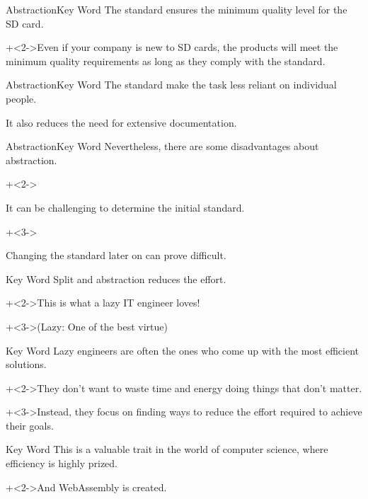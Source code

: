 \begin{frame}{Abstraction}{Key Word}
    The standard ensures the minimum quality level for the SD card.
    \vspace{4ex}

    \onslide+<2->{Even if your company is new to SD cards, the products will meet the minimum quality requirements as long as they comply with the standard.}
\end{frame}


\begin{frame}{Abstraction}{Key Word}
    The standard make the task less reliant on individual people.
    \vspce{4ex}

    It also reduces the need for extensive documentation.
\end{frame}


\begin{frame}{Abstraction}{Key Word}
    Nevertheless, there are some disadvantages about abstraction.
    \vspace{4ex}

    \begin{itemize}
        \onslide+<2->{\item It can be challenging to determine the initial standard.}
        \onslide+<3->{\item Changing the standard later on can prove difficult.}
    \end{itemize}
\end{frame}


\begin{frame}{Key Word}
    Split and abstraction reduces the effort.
    \vspace{4ex}

    \onslide+<2->{This is what a lazy IT engineer loves!}
    \vspace{2ex}

    \onslide+<3->{{\Large (Lazy: One of the best virtue)}}
\end{frame}


\begin{frame}{Key Word}{}
    Lazy engineers are often the ones who come up with the most efficient solutions.
    \vspace{4ex}

    \onslide+<2->{They don't want to waste time and energy doing things that don't matter.}
    \vspace{4ex}

    \onslide+<3->{Instead, they focus on finding ways to reduce the effort required to achieve their goals.}
\end{frame}


\begin{frame}{Key Word}{}
    This is a valuable trait in the world of computer science, where efficiency is highly prized.
    \vspace{4ex}

    \onslide+<2->{And WebAssembly is created.}
\end{frame}
